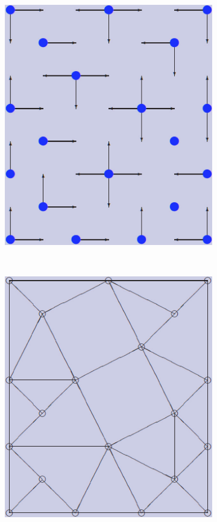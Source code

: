 \documentclass[12pt]{article}
\begin{document}
\begin{figure}[tb]
\begin{subfigure}[b]{0.2\textwidth}
      \caption{}\label{fig:contract_kernel2}
  \end{subfigure}~%
  \begin{subfigure}[b]{0.2\textwidth}
      \includegraphics[width=\textwidth]{img/contract_kernel4}
      \caption{}\label{fig:contract_kernel3}
  \end{subfigure}~%
  \begin{subfigure}[b]{0.2\textwidth}
      \includegraphics[width=\textwidth]{img/contract_kernel5}

\end{subfigure}
\end{figure}
\end{document}
